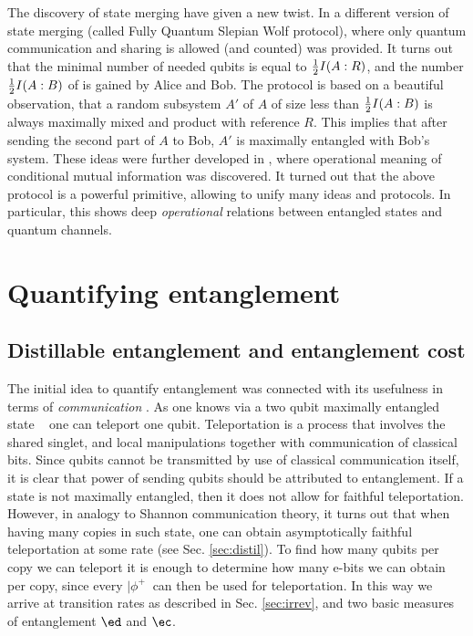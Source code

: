 \documentclass[rmp,12pt,preprint]{revtex4-2}
\begin{document}
The discovery of state merging have given a new twist.
In \cite{AbeyesingheDHW2006-fullSW} a different version of
state merging (called Fully Quantum Slepian Wolf  protocol), where only quantum communication and  sharing \eprpairs  is allowed (and counted) was provided.
It turns out that the minimal number of needed
qubits is equal to ${1\over 2} I(A:R)$, and the number
${1\over 2} I(A:B)$ of \eprpairs is gained by Alice and Bob.
The protocol is based on a beautiful observation,
that a random subsystem $A'$ of $A$ of size less than ${1\over 2}I(A:B)$
is always maximally mixed and product with reference $R$. This implies that
after sending the second part of $A$ to Bob, $A'$ is maximally entangled
with Bob's system. These ideas were further developed in
\cite{DevetakY2006-cond-info}, where operational meaning of
conditional mutual information was  discovered.
It turned out that the above protocol is a powerful primitive,
allowing to unify many ideas and protocols. In particular, this
shows deep {\it operational} relations between entangled
states and quantum channels.

\section{Quantifying entanglement}
\label{sec:miary}
\subsection{Distillable entanglement and entanglement cost}
\label{subsec:edec} The initial idea to quantify entanglement was
connected with its usefulness in terms of {\it communication}
\cite{BBPSSW1996,BDSW1996}. As one knows via a two qubit maximally
entangled state {\it \singlet\ }  one can teleport one qubit.
Teleportation is a process that involves the shared singlet, and
local manipulations together with communication of classical bits.
Since qubits cannot be transmitted by use of classical communication
itself, it is clear that power of sending qubits should be
attributed to entanglement. If a state is not maximally entangled,
then it does not allow for faithful teleportation. However, in
analogy to Shannon communication theory, it turns out that when
having many copies in such  state, one can obtain asymptotically
faithful teleportation at some rate (see Sec. \ref{sec:distil}).
To find how many qubits per copy we can teleport it is enough to
determine how many e-bits we can obtain per copy, since every
$|\phi^+\>$ can then be used for teleportation. In this way we arrive
at transition rates as described in Sec. \ref{sec:irrev}, and two
basic measures of entanglement $\ed$ and $\ec$.
\end{document}
